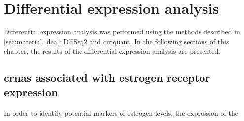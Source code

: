 \section{Differential expression analysis}
Differential expression analysis was performed using the methods described in
\cref{sec:material_dea}: DESeq2 and \gls{ciriquant}.
In the following sections of this chapter, the results of the differential
expression analysis are presented.

\subsection{\Glspl{crna} associated with estrogen receptor expression}

In order to identify potential markers of estrogen levels, the expression of the



